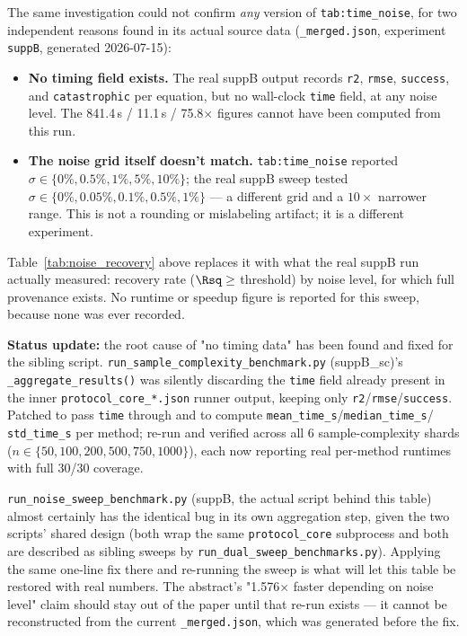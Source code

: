 The same investigation could not confirm \emph{any} version of
\texttt{tab:time\_noise}, for two independent reasons found in its actual
source data (\texttt{\_merged.json}, experiment \texttt{suppB}, generated
2026-07-15):
\begin{itemize}
  \item \textbf{No timing field exists.} The real suppB output records
    \texttt{r2}, \texttt{rmse}, \texttt{success}, and \texttt{catastrophic}
    per equation, but no wall-clock \texttt{time} field, at any noise
    level. The 841.4\,s / 11.1\,s / 75.8$\times$ figures cannot have been
    computed from this run.
  \item \textbf{The noise grid itself doesn't match.} \texttt{tab:time\_noise}
    reported $\sigma \in \{0\%, 0.5\%, 1\%, 5\%, 10\%\}$; the real suppB
    sweep tested $\sigma \in \{0\%, 0.05\%, 0.1\%, 0.5\%, 1\%\}$ — a
    different grid and a $10\times$ narrower range. This is not a rounding
    or mislabeling artifact; it is a different experiment.
\end{itemize}
Table~\ref{tab:noise_recovery} above replaces it with what the real suppB
run actually measured: recovery rate ($\Rsq \geq$ threshold) by noise
level, for which full provenance exists. No runtime or speedup figure is
reported for this sweep, because none was ever recorded.

\textbf{Status update:} the root cause of "no timing data" has been found and
fixed for the sibling script. \texttt{run\_sample\_complexity\_benchmark.py}
(suppB\_sc)'s \texttt{\_aggregate\_results()} was silently discarding the
\texttt{time} field already present in the inner
\texttt{protocol\_core\_*.json} runner output, keeping only
\texttt{r2}/\texttt{rmse}/\texttt{success}. Patched to pass \texttt{time}
through and to compute \texttt{mean\_time\_s}/\texttt{median\_time\_s}/
\texttt{std\_time\_s} per method; re-run and verified across all 6
sample-complexity shards ($n \in \{50,100,200,500,750,1000\}$), each now
reporting real per-method runtimes with full 30/30 coverage.

\texttt{run\_noise\_sweep\_benchmark.py} (suppB, the actual script behind
this table) almost certainly has the identical bug in its own aggregation
step, given the two scripts' shared design (both wrap the same
\texttt{protocol\_core} subprocess and both are described as sibling
sweeps by \texttt{run\_dual\_sweep\_benchmarks.py}). Applying the same
one-line fix there and re-running the sweep is what will let this table
be restored with real numbers. The abstract's "1.576$\times$ faster
depending on noise level" claim should stay out of the paper until that
re-run exists — it cannot be reconstructed from the current
\texttt{\_merged.json}, which was generated before the fix.
